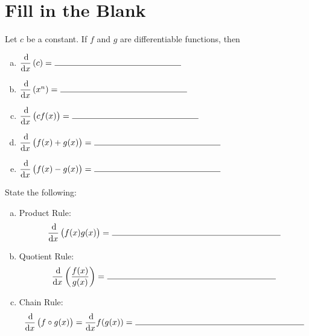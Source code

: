 \documentclass[12pt]{amsart}
\begin{document}
\section*{Fill in the Blank}

\begin{thm}
  Let \(c\) be a constant.
  If \(f\) and \(g\) are differentiable functions, then
  \begin{enumerate}[(a)]
  \item
    \(\dfrac{\dif}{\dif x}\left(c\right) =\ \line(1,0){150}\)
    \vspace{.25in}
  \item
    \(\dfrac{\dif}{\dif x}\left(x^n\right) =\ \line(1,0){150}\)
    \vspace{.25in}
  \item
    \(\dfrac{\dif}{\dif x}\left(cf(x)\right) =\ \line(1,0){150}\)
    \vspace{.25in}
  \item
    \(\dfrac{\dif}{\dif x}\left(f(x) + g(x)\right) =\ \line(1,0){150}\)
    \vspace{.25in}
  \item
    \(\dfrac{\dif}{\dif x}\left(f(x) - g(x)\right) =\ \line(1,0){150}\)
    \vspace{.25in}
  \end{enumerate}
\end{thm}

\begin{thm}[3 Points]
  State the following:
  \begin{enumerate}[(a)]
  \item
    Product Rule:\\
    \[\dfrac{\dif}{\dif x}\left(f(x)g(x)\right) =\ \line(1,0){200}\]
    \vspace{.25in}
  \item
    Quotient Rule:\\
    \[\dfrac{\dif}{\dif x}\left(\dfrac{f(x)}{g(x)}\right) =\ \line(1,0){200}\]
    \vspace{.25in}
  \item
    Chain Rule:\\
    \[\dfrac{\dif}{\dif x}\left(f \circ g (x)\right) = \dfrac{\dif}{\dif x} f(g(x)) =\ \line(1,0){200}\]
    \vspace{.25in}
  \end{enumerate}
\end{thm}

\newpage
\end{document}
